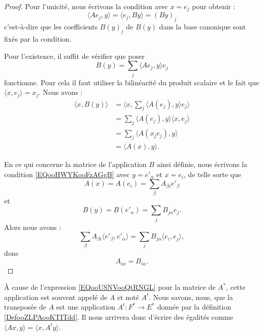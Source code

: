 \begin{proof}
    Pour l'unicité, nous écrivons la condition avec \( x=e_j\) pour obtenir :
    \begin{equation}
        \langle Ae_j, y\rangle = \langle e_j, By\rangle =(By)_j
    \end{equation}
    c'est-à-dire que les coefficients \( B(y)_j\) de \( B(y)\) dans la base canonique sont fixés par la condition.

    Pour l'existence, il suffit de vérifier que poser
    \begin{equation}
        B(y)=\sum_j\langle Ae_j, y\rangle e_j
    \end{equation}
    fonctionne. Pour cela il faut utiliser la bilinéarité du produit scalaire et le fait que \( \langle x, e_j\rangle =x_j\). Nous avons :
    \begin{subequations}
        \begin{align}
            \langle x, B(y)\rangle &=\langle x, \sum_j\langle A(e_j), y\rangle e_j\rangle \\
            &=\sum_j\langle A(e_j), y\rangle \langle x, e_j\rangle \\
            &=\sum_j\langle A(x_je_j), y\rangle \\
            &=\langle A(x), y\rangle .
        \end{align}
    \end{subequations}

En ce qui concerne la matrice de l'application \( B\) ainsi définie, nous écrivons la condition \eqref{EQooHWYKooFzAGgB} avec \( y=e'_{\alpha}\) et \( x=e_i\), de telle sorte que
\begin{equation}
    A(x)=A(e_i)=\sum_{\beta}A_{\beta i}e'_{\beta}
\end{equation}
et
\begin{equation}
    B(y)=B(e'_{\alpha})=\sum_jB_{j\alpha}e_j.
\end{equation}
Alors nous avons :
\begin{equation}
    \sum_{\beta}A_{\beta i}\langle e'_{\beta}, e'_{\alpha}\rangle =\sum_j B_{j\alpha}\langle e_i, e_j\rangle ,
\end{equation}
donc
\begin{equation}
    A_{\alpha i}=B_{i \alpha}.
\end{equation}
\end{proof}

\begin{normaltext}
    À cause de l'expression \eqref{EQooUSNVooQtRNGL} pour la matrice de \( A^*\), cette application est souvent appelé  de \( A\) et noté \( A^t\). Nous savons, nous, que la transposée de \( A\) est une application \( A^t\colon F^*\to E^*\) donnée par la définition \ref{DefooZLPAooKTITdd}. Il nous arrivera donc d'écrire des égalités comme \( \langle Ax, y\rangle=\langle x, A^ty\rangle  \).
\end{normaltext}

